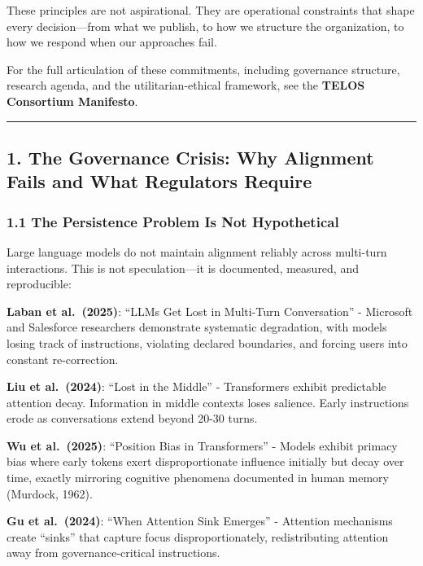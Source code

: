 These principles are not aspirational. They are operational constraints
that shape every decision---from what we publish, to how we structure
the organization, to how we respond when our approaches fail.

For the full articulation of these commitments, including governance
structure, research agenda, and the utilitarian-ethical framework, see
the \textbf{TELOS Consortium Manifesto}.

\begin{center}\rule{0.5\linewidth}{0.5pt}\end{center}

\subsection{1. The Governance Crisis: Why Alignment Fails and What
Regulators
Require}\label{the-governance-crisis-why-alignment-fails-and-what-regulators-require}

\subsubsection{1.1 The Persistence Problem Is Not
Hypothetical}\label{the-persistence-problem-is-not-hypothetical}

Large language models do not maintain alignment reliably across
multi-turn interactions. This is not speculation---it is documented,
measured, and reproducible:

\textbf{Laban et al.~(2025)}: ``LLMs Get Lost in Multi-Turn
Conversation'' - Microsoft and Salesforce researchers demonstrate
systematic degradation, with models losing track of instructions,
violating declared boundaries, and forcing users into constant
re-correction.

\textbf{Liu et al.~(2024)}: ``Lost in the Middle'' - Transformers
exhibit predictable attention decay. Information in middle contexts
loses salience. Early instructions erode as conversations extend beyond
20-30 turns.

\textbf{Wu et al.~(2025)}: ``Position Bias in Transformers'' - Models
exhibit primacy bias where early tokens exert disproportionate influence
initially but decay over time, exactly mirroring cognitive phenomena
documented in human memory (Murdock, 1962).

\textbf{Gu et al.~(2024)}: ``When Attention Sink Emerges'' - Attention
mechanisms create ``sinks'' that capture focus disproportionately,
redistributing attention away from governance-critical instructions.

